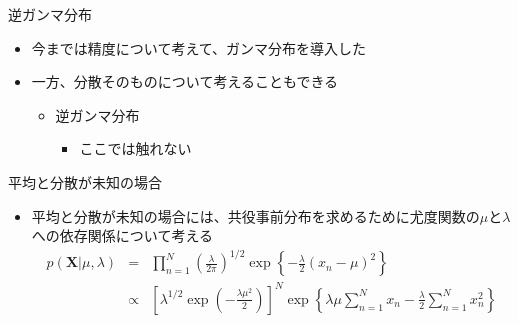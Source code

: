   \begin{frame}{逆ガンマ分布}
   \begin{itemize}
    \item 今までは精度について考えて、ガンマ分布を導入した
    \item 一方、分散そのものについて考えることもできる
          \begin{itemize}
           \item \alert{逆ガンマ分布}
                 \begin{itemize}
                  \item ここでは触れない
                 \end{itemize}
          \end{itemize}
   \end{itemize}
  \end{frame}

  \begin{frame}{平均と分散が未知の場合}
   \begin{itemize}
    \item \alert{平均と分散が未知}の場合には、共役事前分布を求めるために尤度関数の$\mu$と$\lambda$への依存関係について考える
          \begin{eqnarray}
           p(\bm{X}|\mu,\lambda) &=& \prod_{n=1}^{N}\left(\frac{\lambda}{2\pi}\right)^{1/2}\exp\left\{-\frac{\lambda}{2}(x_n-\mu)^2\right\} \nonumber \\
           &\propto & \! \! \left[\lambda^{1/2}\exp\left(-\frac{\lambda\mu^2}{2}\right)\right]^{N}
            \! \! \!\exp\left\{\lambda\mu\sum_{n=1}^{N}x_n-\frac{\lambda}{2}\sum_{n=1}^{N}x_n^2\right\} \nonumber \\
           & &
          \end{eqnarray}
   \end{itemize}
  \end{frame}


